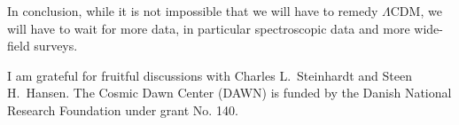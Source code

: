 \documentclass[useAMS,usenatbib,bibyear]{aa}
\begin{document}
In conclusion, while it is not impossible that we will have to remedy $\Lambda$CDM, we will have to wait for more data, in particular spectroscopic data and more wide-field surveys.

\begin{acknowledgements}
    I am grateful for fruitful discussions with Charles L.~Steinhardt and Steen H.~Hansen.
    The Cosmic Dawn Center (DAWN) is funded by the Danish National Research Foundation under grant No. 140.
\end{acknowledgements}



\end{document}
